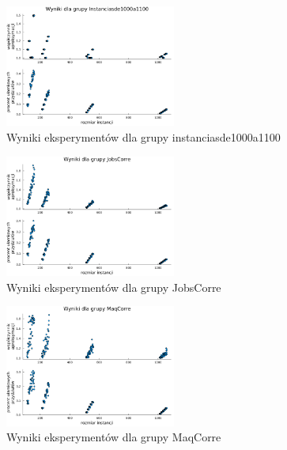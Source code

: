 \documentclass{article}
\begin{document}
\begin{figure}[h!]
    \centering
    \includegraphics[width=0.5\textwidth]{../approximation_ratio_group_instanciasde1000a1100.png}
    \caption{Wyniki eksperymentów dla grupy instanciasde1000a1100}
    \label{fig:group_instanciasde1000a1100}
\end{figure}

\begin{figure}[h!]
    \centering
    \includegraphics[width=0.5\textwidth]{../approximation_ratio_group_JobsCorre.png}
    \caption{Wyniki eksperymentów dla grupy JobsCorre}
    \label{fig:group_JobsCorre}
\end{figure}

\begin{figure}[h!]
    \centering
    \includegraphics[width=0.5\textwidth]{../approximation_ratio_group_MaqCorre.png}
    \caption{Wyniki eksperymentów dla grupy MaqCorre}
    \label{fig:group_MaqCorre}
\end{figure}
\end{document}
